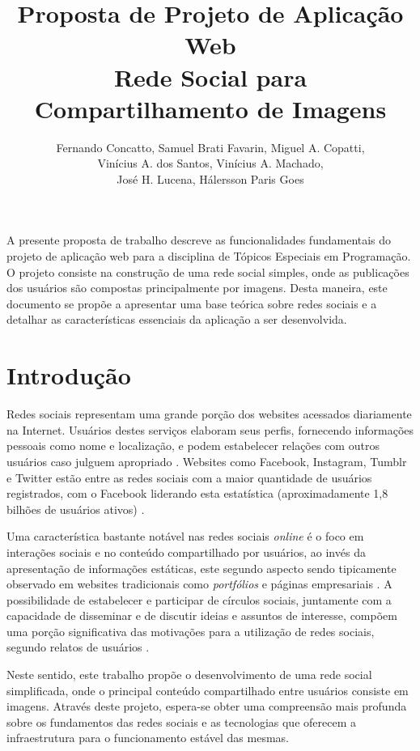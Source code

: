 \documentclass[12pt]{article}
\title{Proposta de Projeto de Aplicação Web\\ Rede Social para Compartilhamento de Imagens}
\author{Fernando Concatto\inst{1}, Samuel Brati Favarin\inst{1}, Miguel A. Copatti\inst{1},\\ Vinícius A. dos Santos\inst{1}, Vinícius A. Machado\inst{1},\\ José H. Lucena\inst{1}, Hálersson Paris Goes\inst{1}}
\begin{document}
\maketitle

\begin{resumo}
  A presente proposta de trabalho descreve as funcionalidades fundamentais do projeto de aplicação web para a disciplina de Tópicos Especiais em Programação. O projeto consiste na construção de uma rede social simples, onde as publicações dos usuários são compostas principalmente por imagens. Desta maneira, este documento se propõe a apresentar uma base teórica sobre redes sociais e a detalhar as características essenciais da aplicação a ser desenvolvida.
\end{resumo}

\section{Introdução} \label{sec:intro}

Redes sociais representam uma grande porção dos websites acessados diariamente na Internet. Usuários destes serviços elaboram seus perfis, fornecendo informações pessoais como nome e localização, e podem estabelecer relações com outros usuários caso julguem apropriado \cite{Mislove2007}. Websites como Facebook, Instagram, Tumblr e Twitter estão entre as redes sociais com a maior quantidade de usuários registrados, com o Facebook liderando esta estatística (aproximadamente 1,8 bilhões de usuários ativos) \cite{Statista2017}.

Uma característica bastante notável nas redes sociais \textit{online} é o foco em interações sociais e no conteúdo compartilhado por usuários, ao invés da apresentação de informações estáticas, este segundo aspecto sendo tipicamente observado em websites tradicionais como \textit{portfólios} e páginas empresariais \cite{Mislove2007}. A possibilidade de estabelecer e participar de círculos sociais, juntamente com a capacidade de disseminar e de discutir ideias e assuntos de interesse, compõem uma porção significativa das motivações para a utilização de redes sociais, segundo relatos de usuários \cite{Cheung2011}.

Neste sentido, este trabalho propõe o desenvolvimento de uma rede social simplificada, onde o principal conteúdo compartilhado entre usuários consiste em imagens. Através deste projeto, espera-se obter uma compreensão mais profunda sobre os fundamentos das redes sociais e as tecnologias que oferecem a infraestrutura para o funcionamento estável das mesmas.
\end{document}
